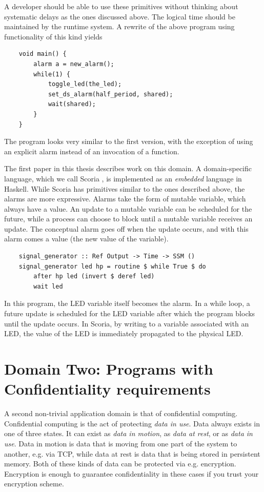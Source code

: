 A developer should be able to use these primitives without thinking about systematic delays as the ones discussed above.
The logical time should be maintained by the runtime system. A rewrite of the above program using functionality of this
kind yields

\begin{verbatim}
    void main() {
        alarm a = new_alarm();
        while(1) {
            toggle_led(the_led);
            set_ds_alarm(half_period, shared);
            wait(shared);
        }
    }
\end{verbatim}

The program looks very similar to the first version, with the exception of using an explicit alarm instead of an
invocation of a  function.

The first paper in this thesis describes work on this domain. A domain-specific language, which we call
Scoria \cite{DBLP:conf/memocode/KrookHSEC22}, is implemented as an \textit{embedded} language in Haskell. While Scoria
has primitives similar to the ones described above, the alarms are more expressive. Alarms take the form of mutable
variable, which always have a value. An update to a mutable variable can be scheduled for the future, while a process can
choose to block until a mutable variable receives an update. The conceptual alarm goes off when the update occurs, and with
this alarm comes a value (the new value of the variable).

\begin{verbatim}
    signal_generator :: Ref Output -> Time -> SSM ()
    signal_generator led hp = routine $ while True $ do
        after hp led (invert $ deref led)
        wait led
\end{verbatim}

In this program, the LED variable itself becomes the alarm. In a while loop, a future update is scheduled for the LED
variable after which the program blocks until the update occurs. In Scoria, by writing to a variable associated
with an LED, the value of the LED is immediately propagated to the physical LED.

\section{Domain Two: Programs with Confidentiality requirements}

A second non-trivial application domain is that of confidential computing. Confidential computing is the act of protecting
\textit{data in use}.
Data always exists in one of three states. It can exist as \textit{data in motion}, as \textit{data at rest}, or as
\textit{data in use}. Data in motion is data that is moving from one part of the system to another, e.g. via TCP, while data at rest
is data that is being stored in persistent memory. Both of these kinds of data can be protected via e.g. encryption.
Encryption is enough to guarantee confidentiality in these cases if you trust your encryption scheme.

